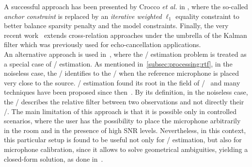 A successful approach has been presented by Crocco \textit{et al.} in , where the so-called \textit{anchor constraint} is replaced by an \textit{iterative weighted} $\ell_1$ equality constraint to better balance sparsity penalty and the model constraints.
Finally, the very recent work~ extends cross-relation approaches under the umbrella of the Kalman filter which was previously used for echo-cancellation applications.
\\An alternative approach is used in~, where the \ReIR/ estimation problem is treated as a special case of \ReIR/ estimation.
As mentioned in~\cref{subsec:processing:rtf}, in the noiseless case, the \ReIR/ identifies to the \ReIR/ when the reference microphone is placed very close to the source.
\ReIR/ estimation found its root in the field of \SEdef/~ and many techniques have been proposed since then~.
By its definition, in the noiseless case, the \ReIR/ describes the relative filter between two observations and not directly their \RIRs/.
The main limitation of this approach is that it is possible only in controlled scenarios, where the user has the possibility to place the microphone arbitrarily in the room and in the presence of high \ac{SNR} levels.
Nevertheless, in this context, this particular setup is found to be useful not only for \RTF/ estimation, but also for microphone calibration, since it allows to solve geometrical ambiguities, yielding a closed-form solution, as done in~.

